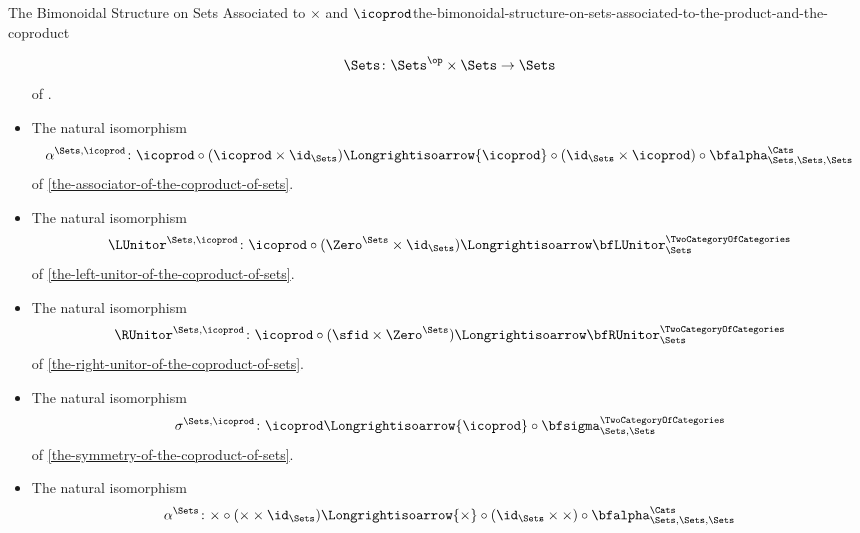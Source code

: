 \begin{proposition}{The Bimonoidal Structure on Sets Associated to $\times$ and $\icoprod$}{the-bimonoidal-structure-on-sets-associated-to-the-product-and-the-coproduct}
\begin{itemize}
            \[
                \Sets%
                \colon%
                \Sets^{\op}\times\Sets%
                \to%
                \Sets%
            \]%
            of .
        \item{}The natural isomorphism
            \[
                \alpha^{\Sets,\icoprod}
                \colon
                {\icoprod}\circ{({\icoprod}\times\id_{\Sets})}
                \Longrightisoarrow
                {\icoprod}\circ{(\id_{\Sets}\times{\icoprod})}\circ{\bfalpha^{\Cats}_{\Sets,\Sets,\Sets}}
            \]
            of \cref{the-associator-of-the-coproduct-of-sets}.
        \item{}The natural isomorphism
            \[
                \LUnitor^{\Sets,\icoprod}%
                \colon%
                {\icoprod}\circ{(\Zero^{\Sets}\times\id_{\Sets})}
                \Longrightisoarrow
                \bfLUnitor^{\TwoCategoryOfCategories}_{\Sets}
            \]
            of \cref{the-left-unitor-of-the-coproduct-of-sets}.
        \item{}The natural isomorphism
            \[
                \RUnitor^{\Sets,\icoprod}%
                \colon%
                {\icoprod}\circ{({\sfid}\times{\Zero^{\Sets}})}%
                \Longrightisoarrow%
                \bfRUnitor^{\TwoCategoryOfCategories}_{\Sets}%
            \]
            of \cref{the-right-unitor-of-the-coproduct-of-sets}.
        \item{}The natural isomorphism
            \[
                \sigma^{\Sets,\icoprod}
                \colon
                {\icoprod}
                \Longrightisoarrow
                {\icoprod}\circ{\bfsigma^{\TwoCategoryOfCategories}_{\Sets,\Sets}}
            \]
            of \cref{the-symmetry-of-the-coproduct-of-sets}.
        \item{}The natural isomorphism
            \[
                \alpha^{\Sets}
                \colon
                {\times}\circ{({\times}\times\id_{\Sets})}
                \Longrightisoarrow
                {\times}\circ{(\id_{\Sets}\times{\times})}\circ{\bfalpha^{\Cats}_{\Sets,\Sets,\Sets}}
\]
\end{itemize}
\end{proposition}
